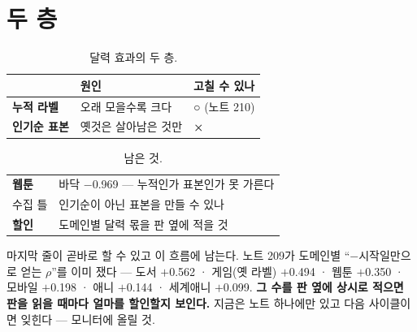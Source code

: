 \documentclass[10pt]{article}
\begin{document}


\section{두 층}

\begin{table}[t]
\centering\tsize
\caption{달력 효과의 두 층.}
\begin{tabular}{lll}
\toprule
& 원인 & 고칠 수 있나 \\
\midrule
\textbf{누적 라벨} & 오래 모을수록 크다 & \textbf{○} (노트 210) \\
\textbf{인기순 표본} & 옛것은 살아남은 것만 & \textbf{×} \\
\bottomrule
\end{tabular}
\end{table}


\begin{table}[t]
\centering\tsize
\caption{남은 것.}
\begin{tabular}{ll}
\toprule
\textbf{웹툰} & 바닥 $-$0.969 --- 누적인가 표본인가 못 가른다 \\
수집 틀 & 인기순이 아닌 표본을 만들 수 있나 \\
\textbf{할인} & 도메인별 달력 몫을 판 옆에 적을 것 \\
\bottomrule
\end{tabular}
\end{table}

마지막 줄이 곧바로 할 수 있고 이 흐름에 남는다. 노트 209가 도메인별
``$-$시작일만으로 얻는 $\rho$''를 이미 쟀다 --- 도서 $+$0.562 · 게임(옛 라벨)
$+$0.494 · 웹툰 $+$0.350 · 모바일 $+$0.198 · 애니 $+$0.144 · 세계애니
$+$0.099. \textbf{그 수를 판 옆에 상시로 적으면 판을 읽을 때마다 얼마를
할인할지 보인다.} 지금은 노트 하나에만 있고 다음 사이클이면 잊힌다 ---
모니터에 올릴 것.
\end{document}
